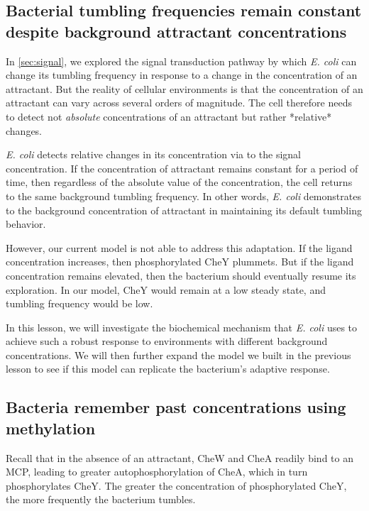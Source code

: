 \subsection{Bacterial tumbling frequencies remain constant despite background attractant concentrations}


In \autoref{sec:signal}, we explored the signal transduction pathway by which \textit{E. coli} can change its tumbling frequency in response to a change in the concentration of an attractant. But the reality of cellular environments is that the concentration of an attractant can vary across several orders of magnitude. The cell therefore needs to detect not \textit{absolute} concentrations of an attractant but rather *relative* changes.

\textit{E. coli} detects relative changes in its concentration via  to the signal concentration. If the concentration of attractant remains constant for a period of time, then regardless of the absolute value of the concentration, the cell returns to the same background tumbling frequency. In other words, \textit{E. coli} demonstrates  to the background concentration of attractant in maintaining its default tumbling behavior.

However, our current model is not able to address this adaptation. If the ligand concentration increases, then phosphorylated CheY plummets. But if the ligand concentration remains elevated, then the bacterium should eventually resume its exploration. In our model, CheY would remain at a low steady state, and tumbling frequency would be low.

In this lesson, we will investigate the biochemical mechanism that \textit{E. coli} uses to achieve such a robust response to environments with different background concentrations. We will then further expand the model we built in the previous lesson to see if this model can replicate the bacterium's adaptive response.

\FloatBarrier
{}
\subsection{Bacteria remember past concentrations using methylation}

Recall that in the absence of an attractant, CheW and CheA readily bind to an MCP, leading to greater autophosphorylation of CheA, which in turn phosphorylates CheY. The greater the concentration of phosphorylated CheY, the more frequently the bacterium tumbles.

